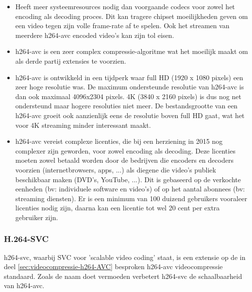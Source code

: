 \begin{itemize}
	
	\item Heeft meer systeemresources nodig dan voorgaande \glspl{codec} voor zowel het \gls{encoding} als \gls{decoding} proces. Dit kan tragere chipset moeilijkheden geven om een video tegen zijn volle \gls{frame-rate} af te spelen. Ook het streamen van meerdere \gls{h264-avc} encoded video's kan zijn tol eisen.
	
	\item \Gls{h264-avc} is een zeer complex \gls{compressie-algoritme} wat het moeilijk maakt om als derde partij extensies te voorzien.
	
	\item \Gls{h264-avc} is ontwikkeld in een tijdperk waar full HD (1920 x 1080 \glspl{pixel}) een zeer hoge resolutie was. De maximum ondersteunde resolutie van \gls{h264-avc} is dan ook maximaal 4096x2304 \glspl{pixel}. 4K (3840 x 2160 \glspl{pixel}) is dus nog net ondersteund maar hogere resoluties niet meer. De bestandsgrootte van een \gls{h264-avc} groeit ook aanzienlijk eens de resolutie boven full HD gaat, wat het voor 4K streaming minder interessant maakt.
	
	\item \Gls{h264-avc} vereist complexe licenties, die bij een herziening in 2015 nog complexer zijn geworden, voor zowel \gls{encoding} als \gls{decoding}. Deze licenties moeten zowel betaald worden door de bedrijven die \glspl{encoder} en \glspl{decoder} voorzien (internetbrowsers, apps, ...) als diegene die video's publiek beschikbaar maken (DVD's, YouTube, ...). Dit is gebaseerd op de verkochte eenheden (bv: individuele software en video's) of op het aantal abonnees (bv: streaming diensten). Er is een minimum van 100 duizend gebruikers vooraleer licenties nodig zijn, daarna kan een licentie tot wel 20 cent per extra gebruiker zijn.
	
\end{itemize}

\subsubsection{H.264-SVC}
\label{sec:videocompressie-h264-SVC}

\Gls{h264-svc}, waarbij SVC voor 'scalable video coding' staat, is een extensie op de in deel \ref{sec:videocompressie-h264-AVC} besproken \gls{h264-avc} \gls{videocompressie} standaard. Zoals de naam doet vermoeden verbetert \gls{h264-svc} de schaalbaarheid van \gls{h264-avc}.

